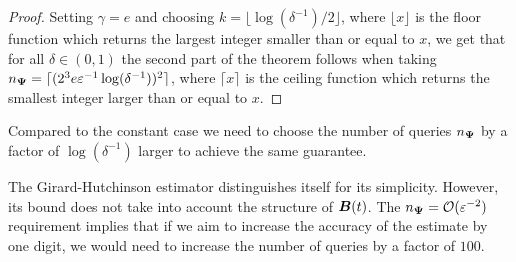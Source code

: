 \documentclass[12pt]{article}
\begin{document}
\begin{proof}
    Setting $\gamma = e$ and choosing $k = \lfloor \log(\delta^{-1}) / 2 \rfloor$, where $\lfloor x \rfloor$ is the floor function which returns the largest integer smaller than or equal to $x$, we get that for all $\delta \in (0, 1)$ the second part of the theorem follows when taking $n_{\boldsymbol{\Psi}} = \lceil (2^3 e \varepsilon^{-1} \log(\delta^{-1}))^2 \rceil$, where $\lceil x \rceil$ is the ceiling function which returns the smallest integer larger than or equal to $x$.

\end{proof}


Compared to the constant case \cite[lemma 2.1]{meyer-2021-hutch-optimal} we need to choose the number of queries $n_{\boldsymbol{\Psi}}$ by a factor of $\log(\delta^{-1})$ larger to achieve the same guarantee.

The Girard-Hutchinson estimator distinguishes itself for its simplicity. However, its bound does not take into account the structure of $\boldsymbol{B}(t)$. The $n_{\boldsymbol{\Psi}} = \mathcal{O}(\varepsilon^{-2})$ requirement implies that if we aim to increase the accuracy of the estimate by one digit, we would need to increase the number of queries by a factor of $100$. 
\end{document}
